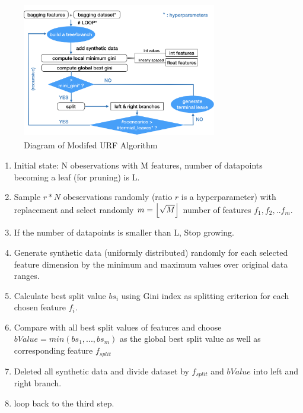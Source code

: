 \documentclass[conference]{IEEEtran}
\DeclarePairedDelimiter\floor{\lfloor}{\rfloor}
\begin{document}
\begin{figure}[!h]
  \begin{center}
  \includegraphics[width=8.5cm,height=6cm]{./images/decisiontree_diagram}
  \end{center}
  \caption{Diagram of Modifed URF Algorithm}
  \label{MURF}
  \end{figure}
  \begin{enumerate}
    \item Initial state: N obeservations with M features, number of datapoints becoming a leaf (for pruning) is L.
    \item Sample $r*N$ obeservations randomly (ratio $r$ is a hyperparameter) with replacement and select randomly $m=\floor*{\sqrt{M}}$ number of features $f_1,f_2,..f_m$.
    \item If the number of datapoints is smaller than L, Stop growing.
    \item Generate synthetic data (uniformly distributed) randomly for each selected feature dimension by the minimum and maximum values over original data ranges.\cite{kruber2018unsupervised}
    \item Calculate best split value $bs_i$ using Gini index as splitting criterion for each chosen feature $f_i$.
    \item Compare with all best split values of features and choose $bValue =min(bs_1,...,bs_m)$ as the global best split value as well as corresponding feature $f_{split}$
    \item Deleted all synthetic data and divide dataset by $f_{split}$ and $bValue$ into left and right branch. 
    \item loop back to the third step.
    \end{enumerate}
\end{document}
